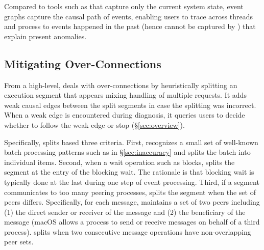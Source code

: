 Compared to tools such as \spindump that capture only the current
system state, event graphs capture the causal path of events, enabling
users to trace across threads and process to events happened in the past
(hence cannot be captured by \spindump) that explain present
anomalies.



\subsection{Mitigating Over-Connections}\label{subsec:fix-over}

From a high-level, \xxx deals with over-connections by heuristically
splitting an execution segment that appears mixing handling of multiple
requests. It adds weak causal edges between the split segments in case
the splitting was incorrect. When a weak edge is encountered during
diagnosis, it queries users to decide whether to follow the weak edge
or stop (\S\ref{sec:overview}).

Specifically, \xxx splits based three criteria.  First, \xxx recognizes a
small set of well-known batch processing patterns such as
 in \S\ref{sec:inaccuracy} and splits the
batch into individual items.  Second, when a wait operation such as
 blocks, \xxx splits the segment at the entry of the blocking
wait.  The rationale is that blocking wait is typically done at the last
during one step of event processing.  Third, if a segment communicates to
too many peering processes, \xxx splits the segment when the set of peers
differs.  Specifically, for each message, \xxx maintains a set of two
peers including (1) the direct sender or receiver of the message and (2)
the beneficiary of the message (macOS allows a process to send or receive
messages on behalf of a third process).  \xxx splits when two consecutive
message operations have non-overlapping peer sets.

